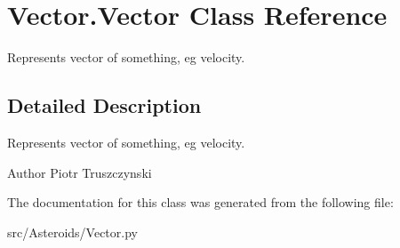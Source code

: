 \hypertarget{classVector_1_1Vector}{}\section{Vector.\+Vector Class Reference}
\label{classVector_1_1Vector}


Represents vector of something, eg velocity.  




\subsection{Detailed Description}
Represents vector of something, eg velocity. 

\begin{DoxyAuthor}{Author}
Piotr Truszczynski 
\end{DoxyAuthor}


The documentation for this class was generated from the following file\+:\begin{DoxyCompactItemize}
\item 
src/\+Asteroids/Vector.\+py\end{DoxyCompactItemize}
